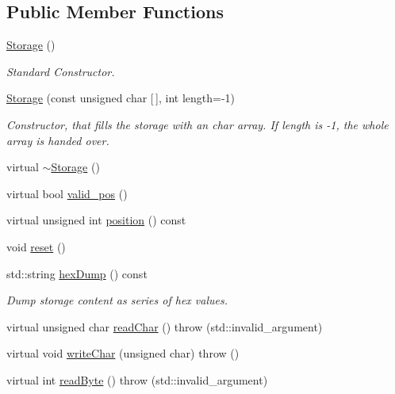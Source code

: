 \subsection*{Public Member Functions}
\begin{DoxyCompactItemize}
\item 
\hyperlink{classtcpip_1_1_storage_a9e1914755462164da7d95a72aa7079a6}{Storage} ()
\begin{DoxyCompactList}\small\item\em Standard Constructor. \end{DoxyCompactList}\item 
\hyperlink{classtcpip_1_1_storage_a6fe8d57f25a565dddf054714fe72e819}{Storage} (const unsigned char \mbox{[}$\,$\mbox{]}, int length=-\/1)
\begin{DoxyCompactList}\small\item\em Constructor, that fills the storage with an char array. If length is -\/1, the whole array is handed over. \end{DoxyCompactList}\item 
virtual \hyperlink{classtcpip_1_1_storage_ae486026b1601908f5b023cf2ae2f79b8}{$\sim$\+Storage} ()
\item 
virtual bool \hyperlink{classtcpip_1_1_storage_a90dbd2c479e5f06fca80783660ffc648}{valid\+\_\+pos} ()
\item 
virtual unsigned int \hyperlink{classtcpip_1_1_storage_a00c4b7b4c74ca5b5418177544bad8dc7}{position} () const
\item 
void \hyperlink{classtcpip_1_1_storage_a5f4f62ada96d7e48465eb27047c4595a}{reset} ()
\item 
std\+::string \hyperlink{classtcpip_1_1_storage_a841ce58366edb7bea45305614b98eaa4}{hex\+Dump} () const
\begin{DoxyCompactList}\small\item\em Dump storage content as series of hex values. \end{DoxyCompactList}\item 
virtual unsigned char \hyperlink{classtcpip_1_1_storage_a9ce771084ea76f4ee0cdc277bd340729}{read\+Char} ()  throw (std\+::invalid\+\_\+argument)
\item 
virtual void \hyperlink{classtcpip_1_1_storage_a563b9a0d45d32ce3f331d29dc949a8e7}{write\+Char} (unsigned char)  throw ()
\item 
virtual int \hyperlink{classtcpip_1_1_storage_aaf174f5fbce4103b3b60c6e5da18e9b5}{read\+Byte} ()  throw (std\+::invalid\+\_\+argument)
\item 

\end{DoxyCompactItemize}
